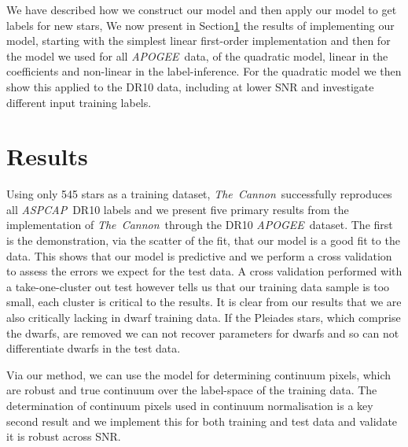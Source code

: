\documentclass[12pt, preprint]{aastex}
\newcommand{\tc}{\textsl{The~Cannon}}
\newcommand{\apogee}{\textsl{APOGEE}}
\newcommand{\aspcap}{\textsl{ASPCAP}}
\begin{document}
We have described how we construct our model and then apply our model to get labels for new stars, We now present in Section\ref{sec:results} the results of implementing our model, starting with the simplest linear first-order implementation and then for the model we used for all \apogee\ data, of the quadratic model, linear in the coefficients and non-linear in the label-inference.  For the quadratic model we then show this applied to the DR10 data, including at lower SNR and investigate different input training labels. 



\section{Results}
\label{sec:results}


Using only 545 stars as a training dataset, \tc\ successfully reproduces all \aspcap\ DR10 labels and we present five primary results from the implementation of \tc\ through the DR10 \apogee\ dataset. The first is the demonstration, via the scatter of the fit, that our model is a good fit to the data. This shows that our model is predictive and we perform a cross validation to assess the errors we expect for the test data. A cross validation performed with a take-one-cluster out test however tells us that our training data sample is too small, each cluster is critical to the results. It is clear from our results that we are also critically lacking in dwarf training data. If the Pleiades stars, which comprise the dwarfs, are removed we can not recover parameters for dwarfs and so can not differentiate dwarfs in the test data.

Via our method, we can use the model for determining continuum pixels, which are robust and true continuum over the label-space of the training data. The determination of continuum pixels used in continuum normalisation is a key second result and we implement this for both training and test data and validate it is robust across SNR. 
\end{document}
